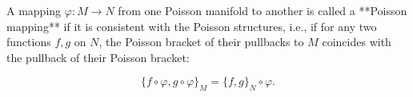 A mapping $\varphi: M \to N$ from one Poisson manifold to another is called a **Poisson mapping** if it is consistent with the Poisson structures, i.e., if for any two functions $f, g$ on $N$, the Poisson bracket of their pullbacks to $M$ coincides with the pullback of their Poisson bracket:

$$\{f \circ \varphi, g \circ \varphi\}_M = \{f, g\}_N \circ \varphi.$$
